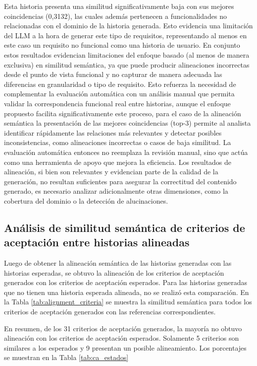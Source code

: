 Esta historia presenta una similitud significativamente baja con sus mejores coincidencias (0,3132), las cuales además pertenecen a funcionalidades no relacionadas con el dominio de la historia generada. Esto evidencia una limitación del LLM a la hora de generar este tipo de requisitos, representando al menos en este caso un requisito no funcional como una historia de usuario.
En conjunto estos resultados evidencian limitaciones del enfoque basado (al menos de manera exclusiva) en similitud semántica, ya que puede producir alineaciones incorrectas desde el punto de vista funcional y no capturar de manera adecuada las diferencias en granularidad o tipo de requisito.
Esto refuerza la necesidad de complementar la evaluación automática con un análisis manual que permita validar la correspondencia funcional real entre historias, aunque el enfoque propuesto facilita significativamente este proceso, para el caso de la alineación semántica la presentación de las mejores coincidencias (top-3) permite al analista identificar rápidamente las relaciones más relevantes y detectar posibles inconsistencias, como alineaciones incorrectas o casos de baja similitud. La evaluación automática entonces no reemplaza la revisión manual, sino que actúa como una herramienta de apoyo que mejora la eficiencia. 
Los resultados de alineación, si bien son relevantes y evidencian parte de la calidad de la generación, no resultan suficientes para asegurar la correctitud del contenido generado, es necesario analizar adicionalmente otras dimensiones, como la cobertura del dominio o la detección de alucinaciones.

\subsection{Análisis de similitud semántica de criterios de aceptación entre historias alineadas}
Luego de obtener la alineación semántica de las historias generadas con las historias esperadas, se obtuvo la alineación de los criterios de aceptación generados con los criterios de aceptación esperados. Para las historias generadas que no tienen una historia esperada alineada, no se realizó esta comparación.
En la Tabla \ref{tab:alignment_criteria} se muestra la similitud semántica para todos los criterios de aceptación generados con las referencias correspondientes.

En resumen, de los 31 criterios de aceptación generados, la mayoría no obtuvo alineación con los criterios de aceptación esperados. Solamente 5 criterios son similares a los esperados y 9 presentan un posible alineamiento. Los porcentajes se muestran en la Tabla \ref{tab:ca_estados}

